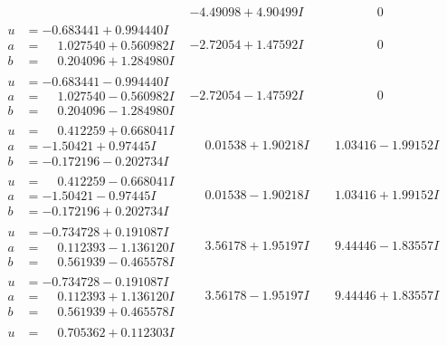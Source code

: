 \documentclass[1p]{elsarticle_modified}
\theoremstyle{definition}
\begin{document}
$$\begin{array}{c|c|c}
 & -4.49098 + 4.90499 I & \phantom{-0.000000 } 0 \\ \hline\begin{aligned}
u &= -0.683441 + 0.994440 I \\
a &= \phantom{-}1.027540 + 0.560982 I \\
b &= \phantom{-}0.204096 + 1.284980 I\end{aligned}
 & -2.72054 + 1.47592 I & \phantom{-0.000000 } 0 \\ \hline\begin{aligned}
u &= -0.683441 - 0.994440 I \\
a &= \phantom{-}1.027540 - 0.560982 I \\
b &= \phantom{-}0.204096 - 1.284980 I\end{aligned}
 & -2.72054 - 1.47592 I & \phantom{-0.000000 } 0 \\ \hline\begin{aligned}
u &= \phantom{-}0.412259 + 0.668041 I \\
a &= -1.50421 + 0.97445 I \\
b &= -0.172196 - 0.202734 I\end{aligned}
 & \phantom{-}0.01538 + 1.90218 I & \phantom{-}1.03416 - 1.99152 I \\ \hline\begin{aligned}
u &= \phantom{-}0.412259 - 0.668041 I \\
a &= -1.50421 - 0.97445 I \\
b &= -0.172196 + 0.202734 I\end{aligned}
 & \phantom{-}0.01538 - 1.90218 I & \phantom{-}1.03416 + 1.99152 I \\ \hline\begin{aligned}
u &= -0.734728 + 0.191087 I \\
a &= \phantom{-}0.112393 - 1.136120 I \\
b &= \phantom{-}0.561939 - 0.465578 I\end{aligned}
 & \phantom{-}3.56178 + 1.95197 I & \phantom{-}9.44446 - 1.83557 I \\ \hline\begin{aligned}
u &= -0.734728 - 0.191087 I \\
a &= \phantom{-}0.112393 + 1.136120 I \\
b &= \phantom{-}0.561939 + 0.465578 I\end{aligned}
 & \phantom{-}3.56178 - 1.95197 I & \phantom{-}9.44446 + 1.83557 I \\ \hline\begin{aligned}
u &= \phantom{-}0.705362 + 0.112303 I \\

\end{aligned}
\end{array}$$
\end{document}
